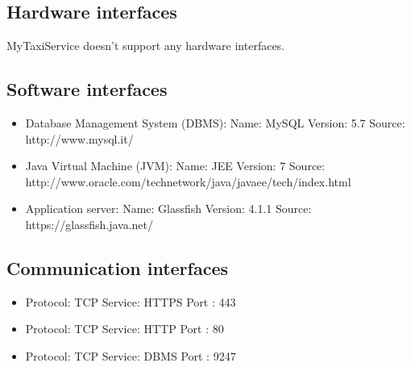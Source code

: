 \subsection{Hardware interfaces}
MyTaxiService doesn't support any hardware interfaces.	\subsection{Software interfaces}
\begin{itemize}
	\item Database Management System (DBMS): \newline
	Name: MySQL \newline
	Version: 5.7 \newline
	Source: http://www.mysql.it/ 
	\item Java Virtual Machine (JVM):\newline
	Name: JEE \newline
	Version: 7 \newline
	Source: http://www.oracle.com/technetwork/java/javaee/tech/index.html
	\item Application server: \newline
	Name: Glassfish \newline
	Version: 4.1.1 \newline
	Source: https://glassfish.java.net/
\end{itemize}
\subsection{Communication interfaces}
\begin{itemize}
	\item Protocol: TCP Service: HTTPS Port : 443
	\item Protocol: TCP Service: HTTP  Port : 80
	\item Protocol: TCP Service: DBMS  Port : 9247
\end{itemize}
